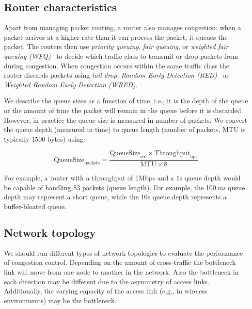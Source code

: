 \subsection{Router characteristics}


Apart from managing packet routing, a router also manages congestion; when a
packet arrives at a higher rate than it can process the packet, it queues the
packet. The routers then use \emph{priority queuing}, \emph{fair queuing}, or
\emph{weighted fair queuing (WFQ)}~\cite{rfc4594} to decide which traffic
class to transmit or drop packets from during congestion. When congestion
occurs within the same traffic class the router discards packets using
\emph{tail drop}, \emph{Random Early Detection (RED)}~\cite{Floyd:RED} or
\emph{Weighted Random Early Detection (WRED)}.

We describe the queue sizes as a function of time, i.e., it is the depth of
the queue or the amount of time the packet will remain in the queue before it
is discarded. However, in practice the queue size is measured in number of
packets. We convert the queue depth (measured in time) to queue length (number
of packets, MTU is typically 1500 bytes) using:

\begin{equation*}
  \mathrm{QueueSize}_\mathrm{packets} = 
    \frac{\mathrm{QueueSize}_\mathrm{sec} \times
    \mathrm{Throughput}_\mathrm{bps}}{\mathrm{MTU} \times \mathrm{8}}
\end{equation*}

For example, a router with a throughput of 1Mbps and a 1s queue depth would be
capable of handling 83 packets (queue length). For example, the 100\,\emph{ms}
queue depth may represent a short queue, while the 10s queue depth represents
a buffer-bloated queue.

\subsection{Network topology}

We should run different types of network topologies to evaluate the
performance of congestion control. Depending on the amount of cross-traffic
the bottleneck link will move from one node to another in the network. Also
the bottleneck in each direction may be different due to the asymmetry of
access links. Additionally, the varying capacity of the access link (e.g., in
wireless environments) may be the bottleneck.


